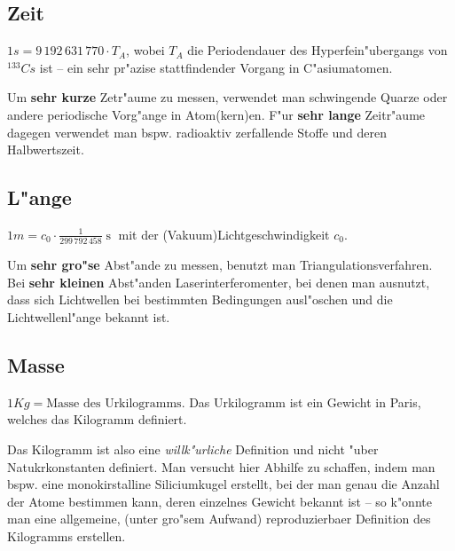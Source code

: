 \subsection{Zeit}

\begin{Def}\label{def_sekunde}
   $1s = 9 \, 192\, 631\, 770 \cdot T_A$, wobei $T_A$ die
   Periodendauer des Hyperfein"ubergangs von $^{133}Cs$ ist -- ein sehr
   pr"azise stattfindender Vorgang in C"asiumatomen.
\end{Def}

Um \textbf{sehr kurze} Zetr"aume zu messen, verwendet man schwingende
Quarze oder andere periodische Vorg"ange in Atom(kern)en. F"ur
\textbf{sehr lange} Zeitr"aume dagegen verwendet man bspw. radioaktiv
zerfallende Stoffe und deren Halbwertszeit.





\subsection{L"ange}

\begin{Def}\label{def_meter}
   $1m = c_0 \cdot \frac{1}{299\, 792\, 458}\operatorname{s}$ mit der
   (Vakuum)Lichtgeschwindigkeit $c_0$.
\end{Def}

Um \textbf{sehr gro"se} Abst"ande zu messen, benutzt man
Triangulationsverfahren. Bei \textbf{sehr kleinen} Abst"anden
Laserinterferomenter, bei denen man ausnutzt, dass sich Lichtwellen
bei bestimmten Bedingungen ausl"oschen und die Lichtwellenl"ange bekannt
ist.





\subsection{Masse}

\begin{Def}\label{def_kilogramm}
   $1Kg = \text{Masse des Urkilogramms}$. Das Urkilogramm ist ein
   Gewicht in Paris, welches das Kilogramm definiert.
\end{Def}

Das Kilogramm ist also eine \emph{willk"urliche} {Definition} und nicht
"uber Natukrkonstanten definiert. Man versucht hier Abhilfe zu
schaffen, indem man bspw. eine monokirstalline Siliciumkugel erstellt,
bei der man genau die Anzahl der Atome bestimmen kann, deren einzelnes
Gewicht bekannt ist -- so k"onnte man eine allgemeine, (unter gro"sem
Aufwand) reproduzierbaer Definition des Kilogramms erstellen.








